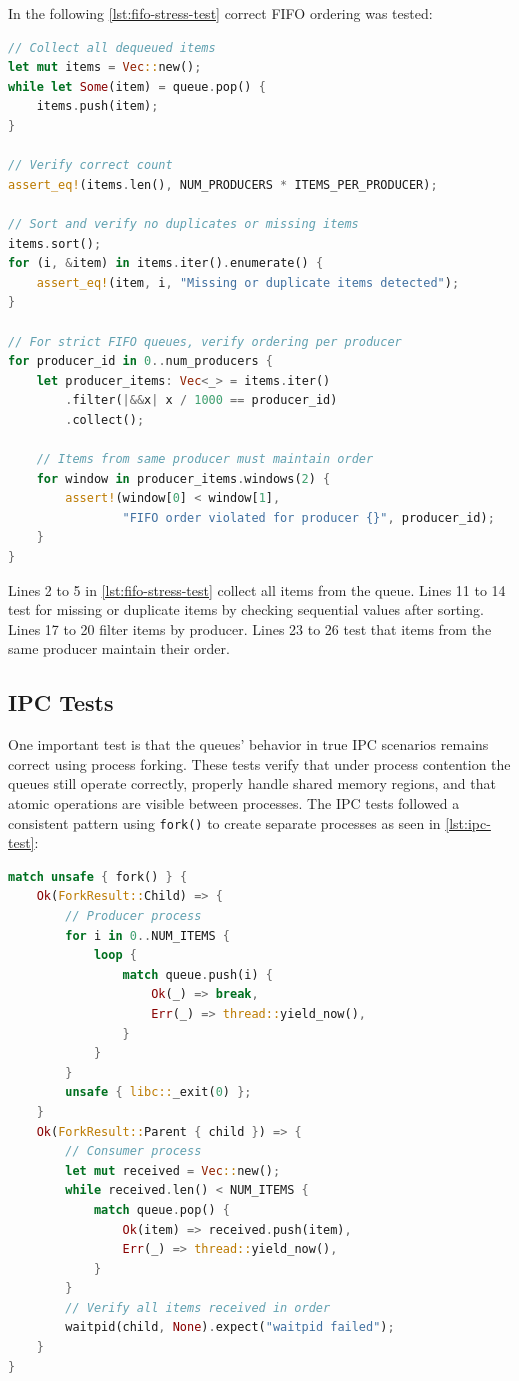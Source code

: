 In the following \cref{lst:fifo-stress-test} correct \ac{FIFO} ordering was tested:

\begin{lstlisting}[language=Rust, style=boxed, caption={FIFO ordering verification under stress}, label={lst:fifo-stress-test}]
// Collect all dequeued items
let mut items = Vec::new();
while let Some(item) = queue.pop() {
    items.push(item);
}

// Verify correct count
assert_eq!(items.len(), NUM_PRODUCERS * ITEMS_PER_PRODUCER);

// Sort and verify no duplicates or missing items
items.sort();
for (i, &item) in items.iter().enumerate() {
    assert_eq!(item, i, "Missing or duplicate items detected");
}

// For strict FIFO queues, verify ordering per producer
for producer_id in 0..num_producers {
    let producer_items: Vec<_> = items.iter()
        .filter(|&&x| x / 1000 == producer_id)
        .collect();
    
    // Items from same producer must maintain order
    for window in producer_items.windows(2) {
        assert!(window[0] < window[1], 
                "FIFO order violated for producer {}", producer_id);
    }
}
\end{lstlisting}

Lines 2 to 5 in \cref{lst:fifo-stress-test} collect all items from the queue. Lines 11 to 14 test for missing or duplicate items by checking sequential values after sorting. Lines 17 to 20 filter items by producer. Lines 23 to 26 test that items from the same producer maintain their order.

\subsection{\acf{IPC} Tests}
One important test is that the queues' behavior in true \ac{IPC} scenarios remains correct using process forking. These tests verify that under process contention the queues still operate correctly, properly handle shared memory regions, and that atomic operations are visible between processes. The \ac{IPC} tests followed a consistent pattern using \texttt{fork()} to create separate processes as seen in \cref{lst:ipc-test}:

\begin{lstlisting}[language=Rust, style=boxed, caption={IPC test structure}, label={lst:ipc-test}]
match unsafe { fork() } {
    Ok(ForkResult::Child) => {
        // Producer process
        for i in 0..NUM_ITEMS {
            loop {
                match queue.push(i) {
                    Ok(_) => break,
                    Err(_) => thread::yield_now(),
                }
            }
        }
        unsafe { libc::_exit(0) };
    }
    Ok(ForkResult::Parent { child }) => {
        // Consumer process
        let mut received = Vec::new();
        while received.len() < NUM_ITEMS {
            match queue.pop() {
                Ok(item) => received.push(item),
                Err(_) => thread::yield_now(),
            }
        }
        // Verify all items received in order
        waitpid(child, None).expect("waitpid failed");
    }
}
\end{lstlisting}

